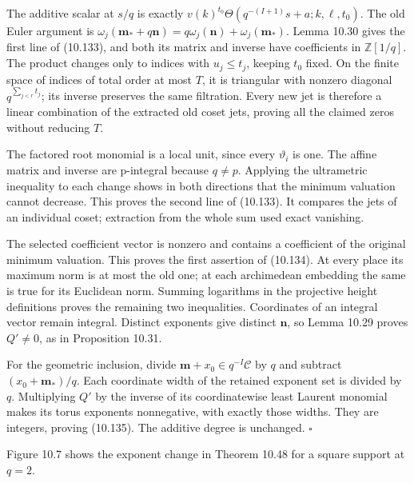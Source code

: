 \documentclass[
  11pt,
  a4paper,
]{article}
\begin{document}
The additive scalar at \(s/q\) is exactly
\(v(k)^{t_0}\Theta(q^{-(I+1)}s+a;k,\ell,t_0)\). The old Euler argument
is \(\omega_j(\boldsymbol m_*+q\boldsymbol n)=
q\omega_j(\boldsymbol n)+\omega_j(\boldsymbol m_*)\). Lemma 10.30 gives
the first line of (10.133), and both its matrix and inverse have
coefficients in \(\mathbb Z[1/q]\). The product changes only to indices
with \(u_j\le t_j\), keeping \(t_0\) fixed. On the finite space of
indices of total order at most \(T\), it is triangular with nonzero
diagonal \(q^{\sum_{j<r}t_j}\); its inverse preserves the same
filtration. Every new jet is therefore a linear combination of the
extracted old coset jets, proving all the claimed zeros without reducing
\(T\).

The factored root monomial is a local unit, since every \(\vartheta_i\)
is one. The affine matrix and inverse are p-integral because \(q\ne p\).
Applying the ultrametric inequality to each change shows in both
directions that the minimum valuation cannot decrease. This proves the
second line of (10.133). It compares the jets of an individual coset;
extraction from the whole sum used exact vanishing.

The selected coefficient vector is nonzero and contains a coefficient of
the original minimum valuation. This proves the first assertion of
(10.134). At every place its maximum norm is at most the old one; at
each archimedean embedding the same is true for its Euclidean norm.
Summing logarithms in the projective height definitions proves the
remaining two inequalities. Coordinates of an integral vector remain
integral. Distinct exponents give distinct \(\boldsymbol n\), so Lemma
10.29 proves \(Q'\ne0\), as in Proposition 10.31.

For the geometric inclusion, divide
\(\boldsymbol m+x_0\in q^{-I}\mathcal C\) by \(q\) and subtract
\((x_0+\boldsymbol m_*)/q\). Each coordinate width of the retained
exponent set is divided by \(q\). Multiplying \(Q'\) by the inverse of
its coordinatewise least Laurent monomial makes its torus exponents
nonnegative, with exactly those widths. They are integers, proving
(10.135). The additive degree is unchanged. \(\square\)

Figure 10.7 shows the exponent change in Theorem 10.48 for a square
support at \(q=2\).
\end{document}
